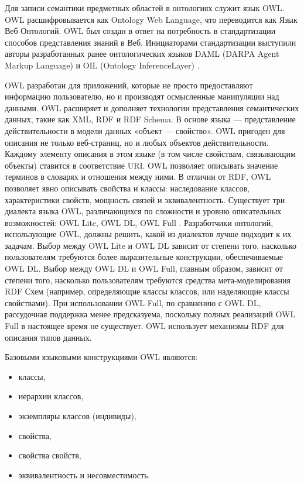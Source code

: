 Для записи семантики предметных областей в онтологиях служит язык OWL. OWL расшифровывается как Ontology Web Language, что переводится как Язык Веб Онтологий. OWL был создан в ответ на потребность в стандартизации способов представления знаний в Веб. Инициаторами стандартизации выступили авторы разработанных ранее онтологических языков DAML (DARPA Agent Markup Language) и OIL (Ontology InferenceLayer)  \cite{trofim2011evo}. 

OWL разработан для приложений, которые не просто предоставляют информацию пользователю, но и производят осмысленные манипуляции над данными. OWL расширяет и дополняет технологии представления семантических данных, такие как XML, RDF и RDF Schema. В основе языка — представление действительности в модели данных «объект — свойство». OWL пригоден для описания не только веб-страниц, но и любых объектов действительности. Каждому элементу описания в этом языке (в том числе свойствам, связывающим объекты) ставится в соответствие URI. OWL позволяет описывать значение терминов в словарях и отношения между ними. В отличии от RDF, OWL позволяет явно описывать свойства и классы: наследование классов, характеристики свойств, мощность связей и эквивалентность. Существует три диалекта языка OWL, различающихся по сложности и уровню описательных возможностей: OWL Lite, OWL DL, OWL Full \cite{mcguinness2004owl}. Разработчики онтологий, использующие OWL, должны решить, какой из диалектов лучше подходит к их задачам. Выбор между OWL Lite и OWL DL зависит от степени того, насколько пользователям требуются более выразительные конструкции, обеспечиваемые OWL DL. Выбор между OWL DL и OWL Full, главным образом, зависит от степени того, насколько пользователям требуются средства мета-моделирования RDF Схем (например, определяющие классы классов, или наделяющие классы свойствами). При использовании OWL Full, по сравнению с OWL DL, рассудочная поддержка менее предсказуема, поскольку полных реализаций OWL Full в настоящее время не существует. OWL использует механизмы RDF для описания типов данных. 

Базовыми языковыми конструкциями OWL являются:

\begin{itemize}
\item классы, 
\item иерархии классов,
\item экземпляры классов (индивиды),
\item свойства,
\item свойства свойств,
\item эквивалентность и несовместимость.
\end{itemize}

